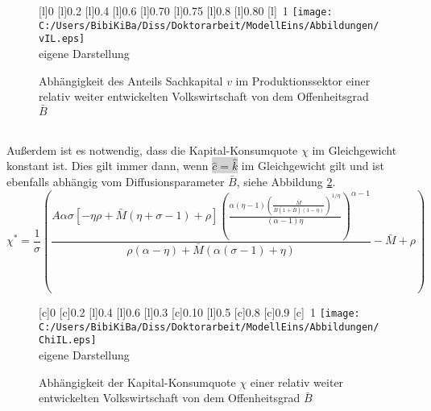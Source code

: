 \begin{figure}[htb] 
\vspace{0.13cm}
 \centering 
		\psfrag{-}{  $_-$}
		[l]{\footnotesize{0}}
		[l]{\footnotesize{0.2}}
		[l]{\footnotesize{0.4}}
		[l]{\footnotesize{0.6}}
		[l]{\footnotesize{0.70}}
		[l]{\footnotesize{0.75}}
		[l]{\footnotesize{0.8}}
		[l]{\footnotesize{0.80}}
		[l]{~\footnotesize{1}}
\texttt{[image: C:/Users/BibiKiBa/Diss/Doktorarbeit/ModellEins/Abbildungen/vIL.eps]}
\\
\hfill\footnotesize{}  eigene Darstellung
	\caption{Abhängigkeit des Anteils Sachkapital $v$ im Produktionssektor einer relativ weiter entwickelten Volkswirtschaft von dem Offenheitsgrad $\bar{B}$}
	\label{fig:VeränderungSachkapitalOffenheit}
\end{figure}
\\
Au{\ss}erdem ist es notwendig, dass die Kapital-Konsumquote $\chi$ im Gleichgewicht konstant ist. Dies gilt immer dann, wenn \colorbox{lightgray}{$\hat{c}=\hat{k}$} im Gleichgewicht gilt und ist ebenfalls abhängig vom Diffusionsparameter $\bar{B}$, siehe Abbildung \ref{fig:ChiIL}.
\begin{equation}
\boxed{\chi^*=\frac{1}{\sigma}\left(\frac{A\alpha \sigma[-\eta\rho+\bar{M}(\eta+\sigma-1)+\rho] \left(\frac{\alpha  (\eta -1) \left(\frac{\bar{M}}{B (1+\bar{B})(1-\eta) }\right)^{1/\eta }}{(\alpha -1) \eta }\right)^{\alpha -1}}{\rho  (\alpha -\eta )+\bar{M} (\alpha  (\sigma -1)+\eta )}-\bar{M}+\rho\right)}
\end{equation}
\begin{figure}[h!] 
\vspace{0.23cm}
 \centering 
		[c]{\footnotesize{0}}
		[c]{\footnotesize{0.2}}
		[l]{\footnotesize{0.4}}
		[l]{\footnotesize{0.6}}
		[l]{\footnotesize{0.3}}
		[c]{\footnotesize{0.10}}
		[l]{\footnotesize{0.5}}
		[c]{\footnotesize{0.8}}
		[c]{\footnotesize{0.9}}
		[c]{~\footnotesize{1}}
\texttt{[image: C:/Users/BibiKiBa/Diss/Doktorarbeit/ModellEins/Abbildungen/ChiIL.eps]}
\\
\hfill\footnotesize{}  eigene Darstellung
	\caption{Abhängigkeit der Kapital-Konsumquote $\chi$ einer relativ weiter entwickelten Volkswirtschaft von dem Offenheitsgrad $\bar{B}$}
	\label{fig:ChiIL}
\end{figure}

